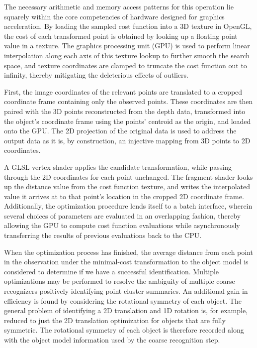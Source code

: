 \documentclass[letterpaper, 10 pt, conference]{ieeeconf}  %
\begin{document}

The necessary arithmetic and memory access patterns for this operation
lie squarely within the core competencies of hardware designed for
graphics acceleration. By loading the sampled cost function into a 3D
texture in OpenGL, the cost of each transformed point is obtained by
looking up a floating point value in a texture. The graphics
processing unit (GPU) is used to perform linear interpolation along
each axis of this texture lookup to further smooth the search space,
and texture coordinates are clamped to truncate the cost function out
to infinity, thereby mitigating the deleterious effects of outliers.

First, the image coordinates of the relevant points are translated to
a cropped coordinate frame containing only the observed points. These
coordinates are then paired with the 3D points reconstructed from the
depth data, transformed into the object's coordinate frame using the
points' centroid as the origin, and loaded onto the GPU. The 2D
projection of the original data is used to address the output data as
it is, by construction, an injective mapping from 3D points to 2D
coordinates.

A GLSL vertex shader applies the candidate transformation, while
passing through the 2D coordinates for each point unchanged. The
fragment shader looks up the distance value from the cost function
texture, and writes the interpolated value it arrives at to that
point's location in the cropped 2D coordinate frame. Additionally, the
optimization procedure lends itself to a batch interface, wherein
several choices of parameters are evaluated in an overlapping fashion,
thereby allowing the GPU to compute cost function evaluations while
asynchronously transferring the results of previous evaluations back
to the CPU.

When the optimization process has finished, the average distance from
each point in the observation under the minimal-cost transformation to
the object model is considered to determine if we have a successful
identification. Multiple optimizations may be performed to resolve the
ambiguity of multiple coarse recognizers positively identifying point
cluster summaries. An additional gain in efficiency is found by
considering the rotational symmetry of each object. The general
problem of identifying a 2D translation and 1D rotation is, for
example, reduced to just the 2D translation optimization for objects
that are fully symmetric. The rotational symmetry of each object is
therefore recorded along with the object model information used by the
coarse recognition step.
\end{document}
